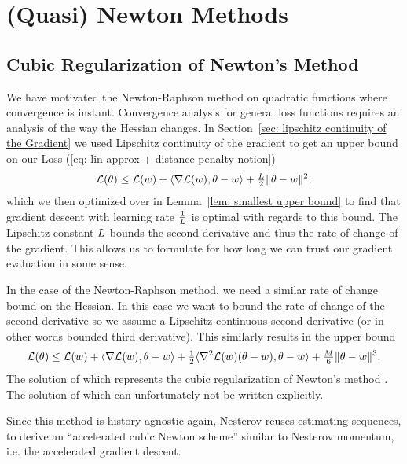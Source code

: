 \section{(Quasi) Newton Methods}

\subsection{Cubic Regularization of Newton's Method}

We have motivated the Newton-Raphson method on quadratic functions where
convergence is instant. Convergence analysis for general loss functions requires
an analysis of the way the Hessian changes. In Section~\ref{sec:
lipschitz continuity of the Gradient} we used Lipschitz continuity of the
gradient to get an upper bound on our Loss (\ref{eq: lin approx + distance
penalty notion})
\begin{align*}
	\mathcal{L}(\theta)
	\le \mathcal{L}(w) + \langle \nabla\mathcal{L}(w), \theta-w \rangle
	+ \tfrac{L}2 \|\theta-w\|^2,
\end{align*}
which we then optimized over in Lemma~\ref{lem: smallest upper bound} to find
that gradient descent with learning rate \(\tfrac1{L}\) is optimal with
regards to this bound. The Lipschitz constant \(L\) bounds the second
derivative and thus the rate of change of the gradient. This allows us to
formulate for how long we can trust our gradient evaluation in some sense.

In the case of the Newton-Raphson method, we need a similar rate of change
bound on the Hessian. In this case we want to bound the rate of change of the
second derivative so we assume a Lipschitz continuous second derivative (or 
in other words bounded third derivative). This similarly results in the upper
bound
\begin{align*}
	\mathcal{L}(\theta)
	\le \mathcal{L}(w) + \langle \nabla\mathcal{L}(w), \theta-w \rangle
	+ \tfrac12\langle \nabla^2\mathcal{L}(w)(\theta-w), \theta-w \rangle
	+ \tfrac{M}6\|\theta-w\|^3.
\end{align*}
The solution of which represents the cubic regularization of Newton's method
\parencite[Section 4.1]{nesterovLecturesConvexOptimization2018}.
The solution of which can unfortunately not be written explicitly.

Since this method is history agnostic again, Nesterov reuses estimating
sequences, to derive an ``accelerated cubic Newton scheme'' \parencite[Section
4.2]{nesterovLecturesConvexOptimization2018} similar to Nesterov momentum, i.e.
the accelerated gradient descent.

